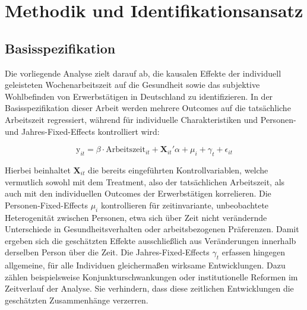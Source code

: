 \documentclass[12pt,a4paper]{article}
\begin{document}
\section{Methodik und Identifikationsansatz}
\subsection{Basisspezifikation}
Die vorliegende Analyse zielt darauf ab, die kausalen Effekte der individuell geleisteten Wochenarbeitszeit auf die  Gesundheit sowie das subjektive Wohlbefinden von Erwerbstätigen in Deutschland zu identifizieren. In der Basisspezifikation dieser Arbeit werden mehrere Outcomes auf die tatsächliche Arbeitszeit regressiert, während für individuelle Charakteristiken und Personen- und Jahres-Fixed-Effects kontrolliert wird:

\begin{equation}
    \text{y}_{it} = \beta\cdot{\text{Arbeitszeit}_{it}}+\boldsymbol{X}_{it}'\alpha+\mu_i+\gamma_{t}+\epsilon_{it}
\end{equation}

Hierbei beinhaltet \( \boldsymbol{X}_{it} \) die bereits eingeführten Kontrollvariablen, welche vermutlich sowohl mit dem Treatment, also der tatsächlichen Arbeitszeit, als auch mit den individuellen Outcomes der Erwerbstätigen korrelieren. Die Personen-Fixed-Effects $\mu_i$ kontrollieren für zeitinvariante, unbeobachtete Heterogenität zwischen Personen, etwa sich über Zeit nicht verändernde Unterschiede in Gesundheitsverhalten oder arbeitsbezogenen Präferenzen. Damit ergeben sich die geschätzten Effekte ausschließlich aus Veränderungen innerhalb derselben Person über die Zeit. Die Jahres-Fixed-Effects $\gamma_t$ erfassen hingegen allgemeine, für alle Individuen gleichermaßen wirksame Entwicklungen. Dazu zählen beispielsweise Konjunkturschwankungen oder institutionelle Reformen im Zeitverlauf der Analyse. Sie verhindern, dass diese zeitlichen Entwicklungen die geschätzten Zusammenhänge verzerren.
\end{document}
